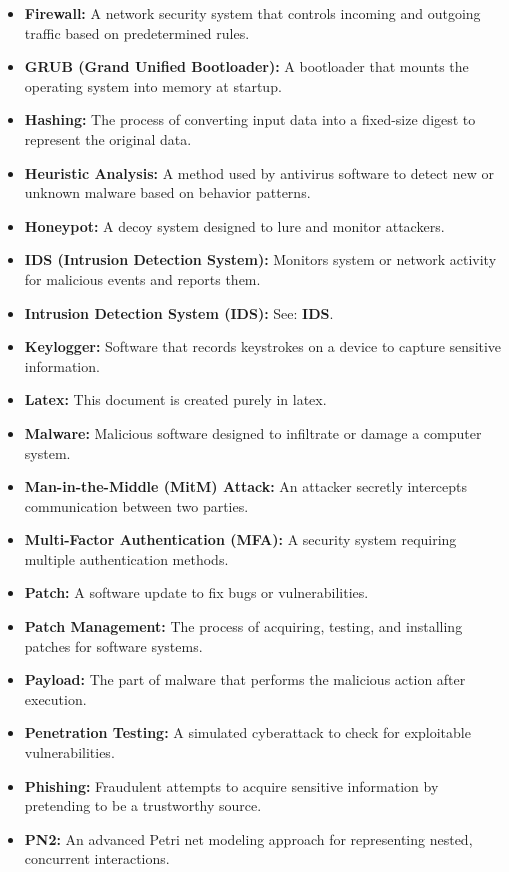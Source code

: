 \documentclass{article}
\begin{document}
\begin{itemize}
    \item \textbf{Firewall:} A network security system that controls incoming and outgoing traffic based on predetermined rules.
    \item \textbf{GRUB (Grand Unified Bootloader):} A bootloader that mounts the operating system into memory at startup.
    \item \textbf{Hashing:} The process of converting input data into a fixed-size digest to represent the original data.
    \item \textbf{Heuristic Analysis:} A method used by antivirus software to detect new or unknown malware based on behavior patterns.
    \item \textbf{Honeypot:} A decoy system designed to lure and monitor attackers.
    \item \textbf{IDS (Intrusion Detection System):} Monitors system or network activity for malicious events and reports them.
    \item \textbf{Intrusion Detection System (IDS):} See: \textbf{IDS}.
    \item \textbf{Keylogger:} Software that records keystrokes on a device to capture sensitive information.
    \item \textbf{Latex:} This document is created purely in latex.
    \item \textbf{Malware:} Malicious software designed to infiltrate or damage a computer system.
    \item \textbf{Man-in-the-Middle (MitM) Attack:} An attacker secretly intercepts communication between two parties.
    \item \textbf{Multi-Factor Authentication (MFA):} A security system requiring multiple authentication methods.
    \item \textbf{Patch:} A software update to fix bugs or vulnerabilities.
    \item \textbf{Patch Management:} The process of acquiring, testing, and installing patches for software systems.
    \item \textbf{Payload:} The part of malware that performs the malicious action after execution.
    \item \textbf{Penetration Testing:} A simulated cyberattack to check for exploitable vulnerabilities.
    \item \textbf{Phishing:} Fraudulent attempts to acquire sensitive information by pretending to be a trustworthy source.
    \item \textbf{PN2:} An advanced Petri net modeling approach for representing nested, concurrent interactions.

\end{itemize}
\end{document}
